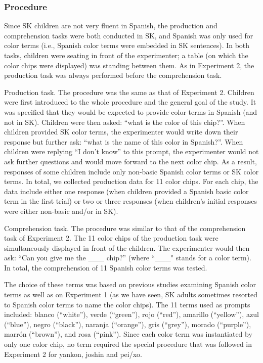 \documentclass[,man,floatsintext]{apa6}
\theoremstyle{definition}
\theoremstyle{definition}
\theoremstyle{definition}
\theoremstyle{remark}
\begin{document}
\subsubsection{Procedure}\label{procedure-2}

Since SK children are not very fluent in Spanish, the production and
comprehension tasks were both conducted in SK, and Spanish was only used
for color terms (i.e., Spanish color terms were embedded in SK
sentences). In both tasks, children were seating in front of the
experimenter; a table (on which the color chips were displayed) was
standing between them. As in Experiment 2, the production task was
always performed before the comprehension task.

Production task. The procedure was the same as that of Experiment 2.
Children were first introduced to the whole procedure and the general
goal of the study. It was specified that they would be expected to
provide color terms in Spanish (and not in SK). Children were then
asked: \enquote{what is the color of this chip?}. When children provided
SK color terms, the experimenter would write down their response but
further ask: \enquote{what is the name of this color in Spanish?}. When
children were replying \enquote{I don't know} to this prompt, the
experimenter would not ask further questions and would move forward to
the next color chip. As a result, responses of some children include
only non-basic Spanish color terms or SK color terms. In total, we
collected production data for 11 color chips. For each chip, the data
include either one response (when children provided a Spanish basic
color term in the first trial) or two or three responses (when
children's initial responses were either non-basic and/or in SK).

Comprehension task. The procedure was similar to that of the
comprehension task of Experiment 2. The 11 color chips of the production
task were simultaneously displayed in front of the children. The
experimenter would then ask: \enquote{Can you give me the \_\_\_ chip?}
(where ``\_\_\_" stands for a color term). In total, the comprehension
of 11 Spanish color terms was tested.

The choice of these terms was based on previous studies examining
Spanish color terms as well as on Experiment 1 (as we have seen, SK
adults sometimes resorted to Spanish color terms to name the color
chips). The 11 terms used as prompts included: blanco (\enquote{white}),
verde (\enquote{green}), rojo (\enquote{red}), amarillo
(\enquote{yellow}), azul (\enquote{blue}), negro (\enquote{black}),
naranja (\enquote{orange}), gris (\enquote{grey}), morado
(\enquote{purple}), marrón (\enquote{brown}), and rosa (\enquote{pink}).
Since each color term was instantiated by only one color chip, no term
required the special procedure that was followed in Experiment 2 for
yankon, joshin and pei/xo.
\end{document}
